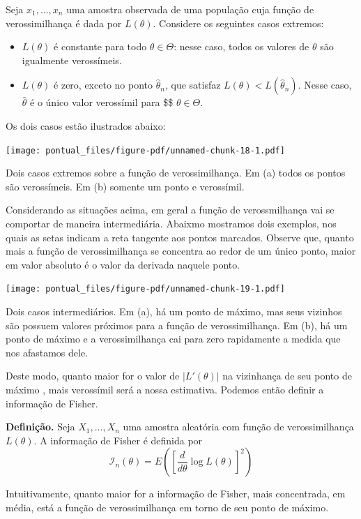 \documentclass[
  letterpaper,
  DIV=11,
  numbers=noendperiod]{scrartcl}
\begin{document}
Seja \(x_1,\ldots,x_n\) uma amostra observada de uma população cuja
função de verossimilhança é dada por \(L(\theta)\). Considere os
seguintes casos extremos:

\begin{itemize}
\item
  \(L(\theta)\) é constante para todo \(\theta\in\Theta\): nesse caso,
  todos os valores de \(\theta\) são igualmente verossímeis.
\item
  \(L(\theta)\) é zero, exceto no ponto \(\hat{\theta}_n\), que satisfaz
  \(L(\theta)<L(\hat{\theta}_n)\). Nesse caso, \(\hat{\theta}\) é o
  único valor verossímil para \$\$ \(\theta\in\Theta\).
\end{itemize}

Os dois casos estão ilustrados abaixo:

\label{fig}
\texttt{[image: pontual\_files/figure-pdf/unnamed-chunk-18-1.pdf]}

Dois casos extremos sobre a função de verossimilhança. Em (a) todos os
pontos são verossímeis. Em (b) somente um ponto e verossímil.

Considerando as situações acima, em geral a função de verossmilhança vai
se comportar de maneira intermediária. Abaixmo mostramos dois exemplos,
nos quais as setas indicam a reta tangente aos pontos marcados. Observe
que, quanto mais a função de verossimilhança se concentra ao redor de um
único ponto, maior em valor absoluto é o valor da derivada naquele
ponto.

\label{fig}
\texttt{[image: pontual\_files/figure-pdf/unnamed-chunk-19-1.pdf]}

Dois casos intermediários. Em (a), há um ponto de máximo, mas seus
vizinhos são possuem valores próximos para a função de verossimilhança.
Em (b), há um ponto de máximo e a verossimilhança cai para zero
rapidamente a medida que nos afastamos dele.

Deste modo, quanto maior for o valor de \(|L'(\theta)|\) na vizinhança
de seu ponto de máximo , mais verossímil será a nossa estimativa.
Podemos então definir a informação de Fisher.

\textbf{Definição.} Seja \(X_1,\ldots,X_n\) uma amostra aleatória com
função de verossimilhança \(L(\theta)\). A informação de Fisher é
definida por
\[\mathcal{I}_n(\theta)=E\left(\left[\frac{d}{d\theta}\log L(\theta)\right]^2\right)\]

Intuitivamente, quanto maior for a informação de Fisher, mais
concentrada, em média, está a função de verossimilhança em torno de seu
ponto de máximo.
\end{document}
